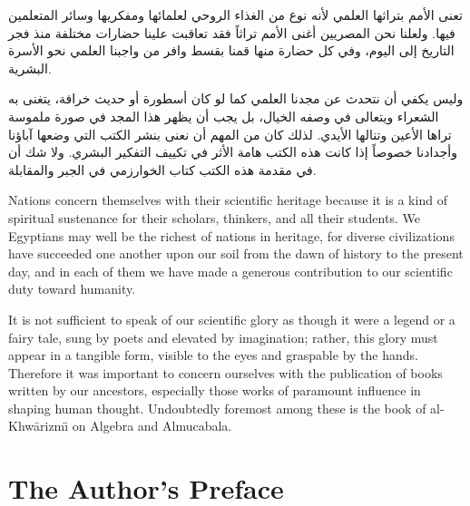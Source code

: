 \documentclass[11pt,a4paper]{book}
\begin{document}
\begin{arabicbox}
\begin{Arabic}
تعنى الأمم بتراثها العلمي لأنه نوع من الغذاء الروحي لعلمائها ومفكريها
وسائر المتعلمين فيها. ولعلنا نحن المصريين أغنى الأمم تراثاً فقد تعاقبت
علينا حضارات مختلفة منذ فجر التاريخ إلى اليوم، وفي كل حضارة منها قمنا
بقسط وافر من واجبنا العلمي نحو الأسرة البشرية.

وليس يكفي أن نتحدث عن مجدنا العلمي كما لو كان أسطورة أو حديث خرافة،
يتغنى به الشعراء ويتعالى في وصفه الخيال، بل يجب أن يظهر هذا المجد في
صورة ملموسة تراها الأعين وتنالها الأيدي. لذلك كان من المهم أن نعنى
بنشر الكتب التي وضعها آباؤنا وأجدادنا خصوصاً إذا كانت هذه الكتب
هامة الأثر في تكييف التفكير البشري. ولا شك أن في مقدمة هذه الكتب
كتاب الخوارزمي في الجبر والمقابلة.
\end{Arabic}
\end{arabicbox}

\vspace{0.5cm}

\begin{small}
Nations concern themselves with their scientific heritage because it is a kind
of spiritual sustenance for their scholars, thinkers, and all their students.
We Egyptians may well be the richest of nations in heritage, for diverse
civilizations have succeeded one another upon our soil from the dawn of
history to the present day, and in each of them we have made a generous
contribution to our scientific duty toward humanity.

It is not sufficient to speak of our scientific glory as though it were a
legend or a fairy tale, sung by poets and elevated by imagination; rather,
this glory must appear in a tangible form, visible to the eyes and graspable
by the hands. Therefore it was important to concern ourselves with the
publication of books written by our ancestors, especially those works of
paramount influence in shaping human thought. Undoubtedly foremost among
these is the book of al-Khw\=arizm\"{\i} on Algebra and Almucabala.
\end{small}

\newpage

\chapter*{The Author's Preface}
\end{document}
